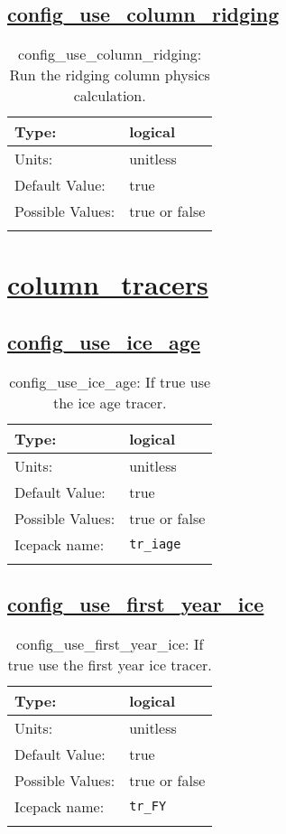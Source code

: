 \subsection[config\_use\_column\_ridging]{\hyperref[sec:nm_tab_column_package]{config\_use\_column\_ridging}}
\label{subsec:nm_sec_config_use_column_ridging}
\begin{center}
\begin{longtable}{| p{2.0in} || p{4.0in} |}
    \hline
    Type: & logical \\
    \hline
    Units: & \si{unitless} \\
    \hline
    Default Value: & true \\
    \hline
    Possible Values: & true or false \\
    \hline
    \caption{config\_use\_column\_ridging: Run the ridging column physics calculation.}
\end{longtable}
\end{center}
\section[column\_tracers]{\hyperref[sec:nm_tab_column_tracers]{column\_tracers}}
\label{sec:nm_sec_column_tracers}
\subsection[config\_use\_ice\_age]{\hyperref[sec:nm_tab_column_tracers]{config\_use\_ice\_age}}
\label{subsec:nm_sec_config_use_ice_age}
\begin{center}
\begin{longtable}{| p{2.0in} || p{4.0in} |}
    \hline
    Type: & logical \\
    \hline
    Units: & \si{unitless} \\
    \hline
    Default Value: & true \\
    \hline
    Possible Values: & true or false \\
    \hline
    Icepack name: & \verb+tr_iage+ \\
    \hline
    \caption{config\_use\_ice\_age: If true use the ice age tracer.}
\end{longtable}
\end{center}
\subsection[config\_use\_first\_year\_ice]{\hyperref[sec:nm_tab_column_tracers]{config\_use\_first\_year\_ice}}
\label{subsec:nm_sec_config_use_first_year_ice}
\begin{center}
\begin{longtable}{| p{2.0in} || p{4.0in} |}
    \hline
    Type: & logical \\
    \hline
    Units: & \si{unitless} \\
    \hline
    Default Value: & true \\
    \hline
    Possible Values: & true or false \\
    \hline
    Icepack name: & \verb+tr_FY+ \\
    \hline
    \caption{config\_use\_first\_year\_ice: If true use the first year ice tracer.}
\end{longtable}
\end{center}
